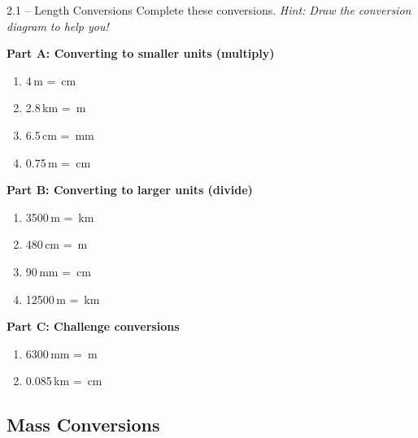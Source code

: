 \documentclass[12pt,a4paper]{article}
\newcommand{\hint}[1]{\textit{\textcolor{primaryblue}{Hint: #1}}}
\begin{document}
\begin{exercisebox}{2.1 -- Length Conversions}
Complete these conversions. \hint{Draw the conversion diagram to help you!}

\textbf{Part A: Converting to smaller units (multiply)}
\begin{enumerate}[leftmargin=*]
\item 4\,m = \underline{\hspace{3cm}}\,cm
\item 2.8\,km = \underline{\hspace{3cm}}\,m
\item 6.5\,cm = \underline{\hspace{3cm}}\,mm
\item 0.75\,m = \underline{\hspace{3cm}}\,cm
\end{enumerate}

\textbf{Part B: Converting to larger units (divide)}
\begin{enumerate}[resume,leftmargin=*]
\item 3500\,m = \underline{\hspace{3cm}}\,km
\item 480\,cm = \underline{\hspace{3cm}}\,m
\item 90\,mm = \underline{\hspace{3cm}}\,cm
\item 12500\,m = \underline{\hspace{3cm}}\,km
\end{enumerate}

\textbf{Part C: Challenge conversions}
\begin{enumerate}[resume,leftmargin=*]
\item 6300\,mm = \underline{\hspace{3cm}}\,m
\item 0.085\,km = \underline{\hspace{3cm}}\,cm
\end{enumerate}
\end{exercisebox}

\subsection{Mass Conversions}
\end{document}
